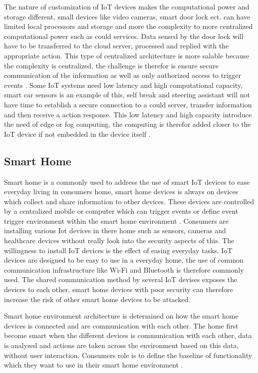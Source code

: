 The nature of customization of IoT devices makes the computational power and storage different, small devices like video cameras, smart door lock ect. can have limited local processors and storage and more the complexity to more centralized computational power such as could services. Data sensed by the door lock will have to be transferred to the cloud server, processed and replied with the appropriate action. This type of centralized architecture is more salable because the complexity is centralized, the challenge is therefor is ensure secure communication of the information as well as only authorized access to trigger events \cite{pavelic2018internet}. Some IoT systems need low latency and high computational capacity, smart car sensors is an example of this, self break and steering assistant will not have time to establish a secure connection to a could server, transfer information and then receive a action response. This low latency and high capacity introduce the need of edge or fog computing, the computing is therefor added closer to the IoT device if not embedded in the device itself \cite{mocrii2018iot}.  


\subsection{Smart Home}
Smart home is a commonly used to address the use of smart IoT devices to ease everyday living in consumers home, smart home devices is always on devices which collect and share information to other devices. These devices are controlled by a centralized mobile or computer which can trigger events or define event trigger environment within the smart home environment \cite{darby2018smart}. Consumers are installing various Iot devices in there home such as sensors, cameras and healthcare devices without really look into the security aspects of this. The willingness to install IoT devices is the effect of easing everyday tasks. IoT devices are designed to be easy to use in a everyday home, the use of common communication infrastructure like Wi-Fi and Bluetooth is therefore commonly used. The shared communication method by several IoT devises exposes the devices to each other, smart home devices with poor security can therefore increase the risk of other smart home devices to be attacked.

Smart home environment architecture is determined on how the smart home devices is connected and are communication with each other. The home first become smart when the different devices is communication with each other, data is analysed and actions are taken across the environment based on this data, without user interaction. Consumers role is to define the baseline of functionality which they want to use in their smart home environment \cite{mocrii2018iot}.

